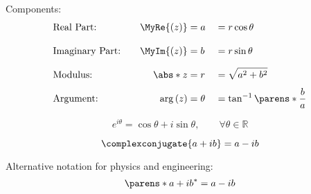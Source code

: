 \begin{multicols}{2}
\begin{CheatsheetEntryFrame}

        Components:
        \begin{alignat*}{3}
            & \text{Real Part:}            & \MyRe{(z)}  &= a      &&= r \cos{\theta} \phantom{\frac{}{a}} \\
            & \text{Imaginary Part:} \quad & \MyIm{(z)}  &= b      &&= r \sin{\theta} \phantom{\frac{b}{a}} \\
            & \text{Modulus:}              & \abs*{z}    &= r      &&= \sqrt{a^2 + b^2} \phantom{\frac{b}{a}} \\
            & \text{Argument:}             & \arg{(z)}   &= \theta &&= \tan^{-1}{\parens*{\frac{b}{a}}}
        \end{alignat*}

        \begin{equation*}
            e^{i \theta} = \cos{\theta} + i \sin{\theta}, \qquad \forall \theta \in \mathbb{R}
        \end{equation*}

    \end{CheatsheetEntryFrame}

    \begin{CheatsheetEntryFrame}

        \begin{equation*}
            \complexconjugate{a + ib} = a - ib
        \end{equation*}

        Alternative notation for physics and engineering:
        \begin{equation*}
            \parens*{a + ib}^* = a - ib
        \end{equation*}


\end{CheatsheetEntryFrame}
\end{multicols}
